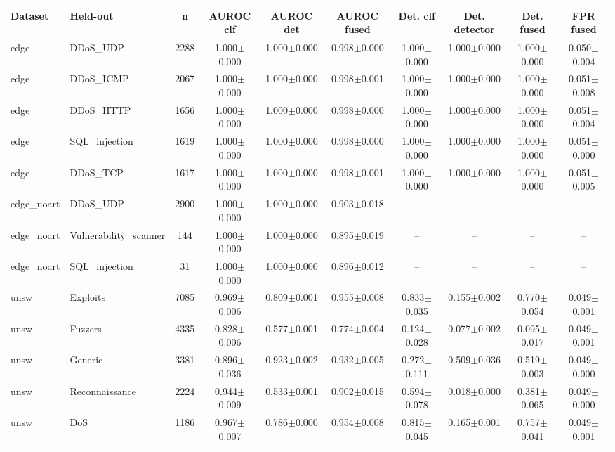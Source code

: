 \begin{tabular}{llcccccccc}
\toprule
Dataset & Held-out & n & AUROC clf & AUROC det & AUROC fused & Det. clf & Det. detector & Det. fused & FPR fused \\
\midrule
edge & DDoS\_UDP & 2288 & 1.000$\pm$0.000 & 1.000$\pm$0.000 & 0.998$\pm$0.000 & 1.000$\pm$0.000 & 1.000$\pm$0.000 & 1.000$\pm$0.000 & 0.050$\pm$0.004 \\
edge & DDoS\_ICMP & 2067 & 1.000$\pm$0.000 & 1.000$\pm$0.000 & 0.998$\pm$0.001 & 1.000$\pm$0.000 & 1.000$\pm$0.000 & 1.000$\pm$0.000 & 0.051$\pm$0.008 \\
edge & DDoS\_HTTP & 1656 & 1.000$\pm$0.000 & 1.000$\pm$0.000 & 0.998$\pm$0.000 & 1.000$\pm$0.000 & 1.000$\pm$0.000 & 1.000$\pm$0.000 & 0.051$\pm$0.004 \\
edge & SQL\_injection & 1619 & 1.000$\pm$0.000 & 1.000$\pm$0.000 & 0.998$\pm$0.000 & 1.000$\pm$0.000 & 1.000$\pm$0.000 & 1.000$\pm$0.000 & 0.051$\pm$0.000 \\
edge & DDoS\_TCP & 1617 & 1.000$\pm$0.000 & 1.000$\pm$0.000 & 0.998$\pm$0.001 & 1.000$\pm$0.000 & 1.000$\pm$0.000 & 1.000$\pm$0.000 & 0.051$\pm$0.005 \\
edge_noart & DDoS\_UDP & 2900 & 1.000$\pm$0.000 & 1.000$\pm$0.000 & 0.903$\pm$0.018 & -- & -- & -- & -- \\
edge_noart & Vulnerability\_scanner & 144 & 1.000$\pm$0.000 & 1.000$\pm$0.000 & 0.895$\pm$0.019 & -- & -- & -- & -- \\
edge_noart & SQL\_injection & 31 & 1.000$\pm$0.000 & 1.000$\pm$0.000 & 0.896$\pm$0.012 & -- & -- & -- & -- \\
unsw & Exploits & 7085 & 0.969$\pm$0.006 & 0.809$\pm$0.001 & 0.955$\pm$0.008 & 0.833$\pm$0.035 & 0.155$\pm$0.002 & 0.770$\pm$0.054 & 0.049$\pm$0.001 \\
unsw & Fuzzers & 4335 & 0.828$\pm$0.006 & 0.577$\pm$0.001 & 0.774$\pm$0.004 & 0.124$\pm$0.028 & 0.077$\pm$0.002 & 0.095$\pm$0.017 & 0.049$\pm$0.001 \\
unsw & Generic & 3381 & 0.896$\pm$0.036 & 0.923$\pm$0.002 & 0.932$\pm$0.005 & 0.272$\pm$0.111 & 0.509$\pm$0.036 & 0.519$\pm$0.003 & 0.049$\pm$0.000 \\
unsw & Reconnaissance & 2224 & 0.944$\pm$0.009 & 0.533$\pm$0.001 & 0.902$\pm$0.015 & 0.594$\pm$0.078 & 0.018$\pm$0.000 & 0.381$\pm$0.065 & 0.049$\pm$0.000 \\
unsw & DoS & 1186 & 0.967$\pm$0.007 & 0.786$\pm$0.000 & 0.954$\pm$0.008 & 0.815$\pm$0.045 & 0.165$\pm$0.001 & 0.757$\pm$0.041 & 0.049$\pm$0.001 \\
\bottomrule
\end{tabular}

